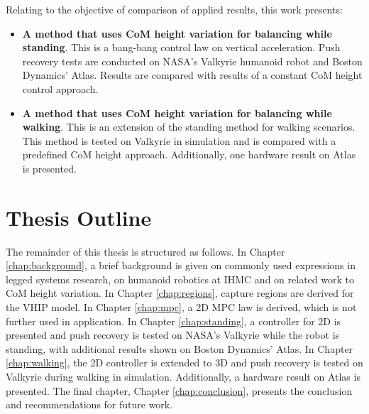 Relating to the objective of comparison of applied results, this work presents:
\begin{itemize}
	\item \textbf{A method that uses \ac{CoM} height variation for balancing while standing}. This is a bang-bang control law on vertical acceleration. Push recovery tests are conducted on NASA's Valkyrie humanoid robot and Boston Dynamics' Atlas. Results are compared with results of a constant \ac{CoM} height control approach.
	\item \textbf{A method that uses \ac{CoM} height variation for balancing while walking}. This is an extension of the standing method for walking scenarios. This method is tested on Valkyrie in simulation and is compared with a predefined \ac{CoM} height approach. Additionally, one hardware result on Atlas is presented.
\end{itemize}
\section{Thesis Outline}
The remainder of this thesis is structured as follows. In Chapter \ref{chap:background}, a brief background is given on commonly used expressions in legged systems research, on humanoid robotics at \ac{IHMC} and on related work to \ac{CoM} height variation. In Chapter \ref{chap:regions}, capture regions are derived for the \ac{VHIP} model. In Chapter \ref{chap:mpc}, a \ac{2D} \ac{MPC} law is derived, which is not further used in application. In Chapter \ref{chap:standing}, a controller for \ac{2D} is presented and push recovery is tested on NASA's Valkyrie while the robot is standing, with additional results shown on Boston Dynamics' Atlas. In Chapter \ref{chap:walking}, the \ac{2D} controller is extended to \ac{3D} and push recovery is tested on Valkyrie during walking in simulation. Additionally, a hardware result on Atlas is presented. The final chapter, Chapter \ref{chap:conclusion}, presents the conclusion and recommendations for future work.


